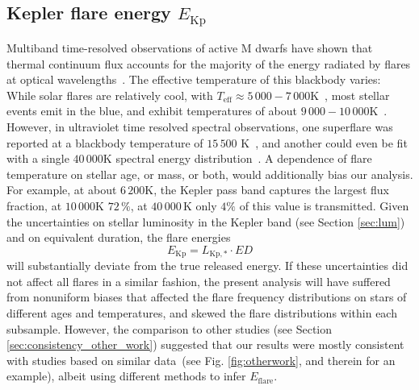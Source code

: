 \documentclass{aa}
\begin{document}
\subsection{Kepler flare energy $E_\mathrm{Kp}$}
\label{sec:en}
Multiband time-resolved observations of active M dwarfs have shown that thermal continuum flux accounts for the majority  of the energy radiated by flares at optical wavelengths~\citep{kowalski2013}.
The effective temperature of this blackbody varies:
While solar flares are relatively cool, with \mbox{$T_\mathrm{eff}\approx5\,000-7\,000 $\;K}~\citep{kleint_solarstellarwlf_2016, kerr_solarstellarwlf_2014, watanabe_solarstellarwlf_2013, namekata_solarstellarwlf_2017}, most stellar events emit in the blue, and exhibit temperatures of about $9\,000-10\,000$\;K~\citep{1992ApJS...78..565H, kretzschmar_sun_2011, davenport_multi-wavelength_2012, shibayama2013}. However, in ultraviolet time resolved spectral observations, one superflare was reported at a blackbody temperature of $15\,500$ K~\citep{loyd2018}, and another could even be fit with a single $40\,000$\;K spectral energy distribution~\citep{froning_40000_2019}.
A dependence of flare temperature on stellar age, or mass, or both, would additionally bias our analysis. For example, at about $6\,200$\;K, the Kepler pass band captures the largest flux fraction, at $10\,000$\;K $72\,\%$, at $40\,000$\,K only $4\%$ of this value is transmitted. 
Given the uncertainties on stellar luminosity in the Kepler band (see Section \ref{sec:lum}) and on equivalent duration, the flare energies
\begin{equation}
E_\mathrm{Kp} = L_\mathrm{Kp,*} \cdot ED
\end{equation}  
will substantially deviate from the true released energy. If these uncertainties did not affect all flares in a similar fashion, the present analysis will have suffered from nonuniform biases that affected the flare frequency distributions on stars of different ages and temperatures, and skewed the flare distributions within each subsample. However, the comparison to other studies (see Section \ref{sec:consistency_other_work}) suggested that our results were mostly consistent with studies based on similar data~(see Fig. \ref{fig:otherwork}, and \citealt{lin2019} therein for an example), albeit using different methods to infer $E_\mathrm{flare}$.  
\end{document}
